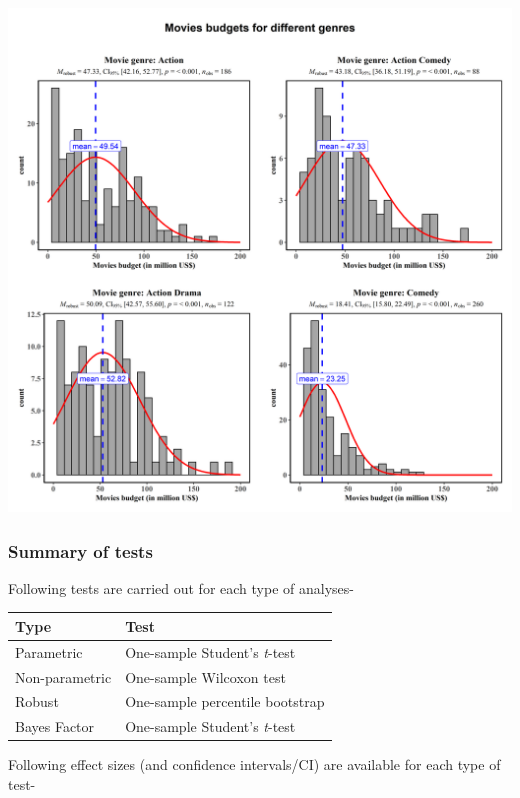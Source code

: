 \documentclass[
]{article}
\begin{document}
\includegraphics[width=1\linewidth]{./figures/paper-gghistostats4-1}

\hypertarget{summary-of-tests-5}{%
\subsubsection{Summary of tests}\label{summary-of-tests-5}}

Following tests are carried out for each type of analyses-

\begin{longtable}[]{@{}ll@{}}
\toprule
Type & Test\tabularnewline
\midrule
\endhead
Parametric & One-sample Student's \emph{t}-test\tabularnewline
Non-parametric & One-sample Wilcoxon test\tabularnewline
Robust & One-sample percentile bootstrap\tabularnewline
Bayes Factor & One-sample Student's \emph{t}-test\tabularnewline
\bottomrule
\end{longtable}

Following effect sizes (and confidence intervals/CI) are available for each type
of test-
\end{document}
